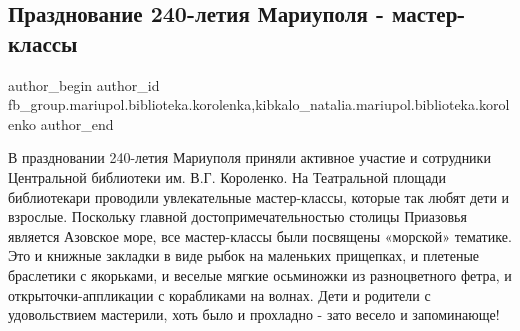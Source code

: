  
 
 
 
 

\subsection{Празднование 240-летия Мариуполя - мастер-классы}
\label{sec:30_09_2018.fb.fb_group.mariupol.biblioteka.korolenka.1.prazdnovanie_240_let}
 
\ifcmt
 author_begin
   author_id fb_group.mariupol.biblioteka.korolenka,kibkalo_natalia.mariupol.biblioteka.korolenko
 author_end
\fi

В праздновании 240-летия Мариуполя приняли активное участие и сотрудники
Центральной  библиотеки им. В.Г. Короленко. На Театральной площади библиотекари
проводили увлекательные мастер-классы, которые так любят дети и взрослые.
Поскольку главной достопримечательностью столицы Приазовья является Азовское
море, все мастер-классы были посвящены «морской» тематике. Это и книжные
закладки в виде рыбок на маленьких прищепках, и плетеные браслетики с
якорьками, и веселые мягкие  осьминожки из разноцветного фетра, и
открыточки-аппликации с корабликами на волнах.  Дети и родители с удовольствием
мастерили, хоть было и прохладно - зато весело и запоминающе!
